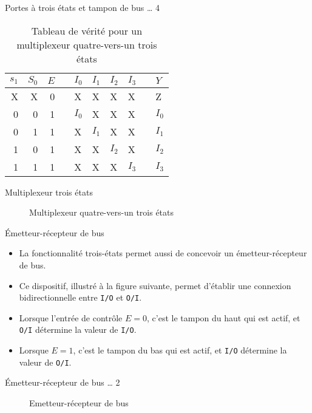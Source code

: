 \documentclass[presentation]{beamer}
\begin{document}
\begin{frame}[label={sec:orgbf30247}]{Portes à trois états et tampon de bus \ldots{} 4}
\begin{table}[htbp]
\caption{\label{tab:orgb44bedf}Tableau de vérité pour un  multiplexeur quatre-vers-un trois états}
\centering
\begin{tabular}{rrrlllllll}
\(s_1\) & \(S_0\) & \(E\) &  & \(I_0\) & \(I_1\) & \(I_2\) & \(I_3\) &  & \(Y\)\\
\hline
X & X & 0 &  & X & X & X & X &  & Z\\
0 & 0 & 1 &  & \(I_0\) & X & X & X &  & \(I_0\)\\
0 & 1 & 1 &  & X & \(I_1\) & X & X &  & \(I_1\)\\
1 & 0 & 1 &  & X & X & \(I_2\) & X &  & \(I_2\)\\
1 & 1 & 1 &  & X & X & X & \(I_3\) &  & \(I_3\)\\
\end{tabular}
\end{table}
\end{frame}

\begin{frame}[label={sec:org68ab6de}]{Multiplexeur trois états}
\begin{figure}[htbp]
\centering

\caption{\label{fig:orgbd9f48c}Multiplexeur quatre-vers-un trois états}
\end{figure}
\end{frame}


\begin{frame}[label={sec:org1029c42},fragile]{Émetteur-récepteur de bus}
 \begin{itemize}
\item La fonctionnalité trois-états permet aussi de concevoir un émetteur-récepteur de bus.

\item Ce dispositif, illustré à la figure suivante, permet d'établir une connexion bidirectionnelle entre \texttt{I/O} et \texttt{O/I}.

\item Lorsque l'entrée de contrôle \(E = 0\), c'est le tampon du haut qui est actif, et \texttt{O/I} détermine la valeur de \texttt{I/O}.

\item Lorsque \(E = 1\), c'est le tampon du bas qui est actif, et \texttt{I/O} détermine la valeur de \texttt{O/I}.
\end{itemize}
\end{frame}

\begin{frame}[label={sec:org7cdfb86}]{Émetteur-récepteur de bus \ldots{} 2}
\begin{figure}[htbp]
\centering

\caption{\label{fig:org9fdfa88}Emetteur-récepteur de bus}
\end{figure}
\end{frame}
\end{document}
